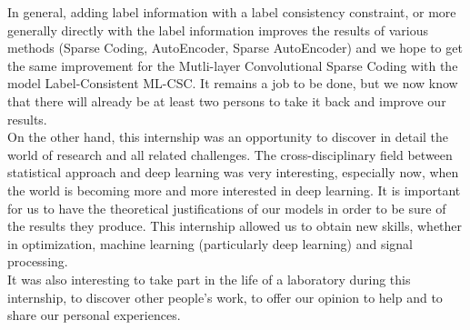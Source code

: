 In general, adding label information with a label consistency constraint, or more generally directly with the label information improves the results of various methods (Sparse Coding, AutoEncoder, Sparse AutoEncoder) and we hope to get the same improvement for the Mutli-layer Convolutional Sparse Coding with the model Label-Consistent ML-CSC. It remains a job to be done, but we now know that there will already be at least two persons to take it back and improve our results.\\

On the other hand, this internship was an opportunity to discover in detail the world of research and all related challenges. The cross-disciplinary field between statistical approach and deep learning was very interesting, especially now, when the world is becoming more and more interested in deep learning. It is important for us to have the theoretical justifications of our models in order to be sure of the results they produce. This internship allowed us to obtain new skills, whether in optimization, machine learning (particularly deep learning) and signal processing.\\
It was also interesting to take part in the life of a laboratory during this internship, to discover other people's work, to offer our opinion to help and to share our personal experiences.
